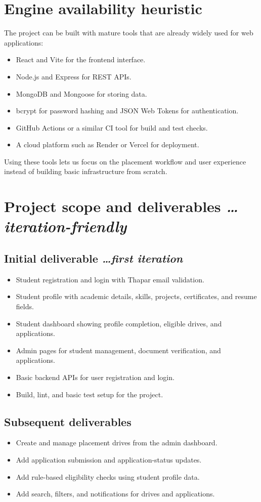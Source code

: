 \documentclass[11pt,a4paper]{article}
\newcommand{\BvrHint}[1]{{\normalfont\normalsize\itshape\hfill #1}}
\begin{document}
\section{Engine availability heuristic}
The project can be built with mature tools that are already widely used for web applications:
\begin{itemize}[leftmargin=0.7cm]
  \item React and Vite for the frontend interface.
  \item Node.js and Express for REST APIs.
  \item MongoDB and Mongoose for storing data.
  \item bcrypt for password hashing and JSON Web Tokens for authentication.
  \item GitHub Actions or a similar CI tool for build and test checks.
  \item A cloud platform such as Render or Vercel for deployment.
\end{itemize}
Using these tools lets us focus on the placement workflow and user experience instead of building basic infrastructure from scratch.

\section{Project scope and deliverables \BvrHint{\ldots iteration-friendly}}
\subsection{Initial deliverable \BvrHint{\ldots first iteration}}
\begin{itemize}[leftmargin=0.7cm]
  \item Student registration and login with Thapar email validation.
  \item Student profile with academic details, skills, projects, certificates, and resume fields.
  \item Student dashboard showing profile completion, eligible drives, and applications.
  \item Admin pages for student management, document verification, and applications.
  \item Basic backend APIs for user registration and login.
  \item Build, lint, and basic test setup for the project.
\end{itemize}

\subsection{Subsequent deliverables}
\begin{itemize}[leftmargin=0.7cm]
  \item Create and manage placement drives from the admin dashboard.
  \item Add application submission and application-status updates.
  \item Add rule-based eligibility checks using student profile data.
  \item Add search, filters, and notifications for drives and applications.
\end{itemize}
\end{document}
